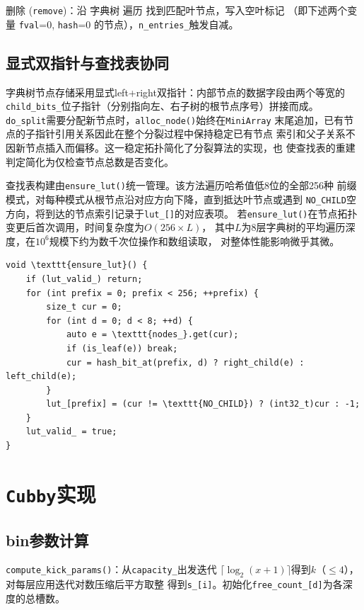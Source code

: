 \documentclass[
    type = bachelor,
    fontset = win,
    decl-page = true,
  ]{njuthesis}
\begin{document}
删除 (\texttt{remove})：沿 字典树 遍历 找到匹配叶节点，写入空叶标记
（即下述两个变量 \texttt{fval}=0, \texttt{hash}=0 的节点），\texttt{n\_entries\_}触发自减。

\subsection{显式双指针与查找表协同}

字典树节点存储采用显式left+right双指针：内部节点的数据字段由两个等宽的
\texttt{child\_bits\_}位子指针（分别指向左、右子树的根节点序号）拼接而成。
\texttt{do\_split}需要分配新节点时，\texttt{alloc\_node()}始终在\texttt{MiniArray}
末尾追加，已有节点的子指针引用关系因此在整个分裂过程中保持稳定已有节点
索引和父子关系不因新节点插入而偏移。这一稳定拓扑简化了分裂算法的实现，也
使查找表的重建判定简化为仅检查节点总数是否变化。

查找表构建由\texttt{ensure\_lut()}统一管理。该方法遍历哈希值低8位的全部256种
前缀模式，对每种模式从根节点沿对应方向下降，直到抵达叶节点或遇到
\texttt{NO\_CHILD}空方向，将到达的节点索引记录于\texttt{lut\_[]}的对应表项。
若\texttt{ensure\_lut()}在节点拓扑变更后首次调用，时间复杂度为$O(256 \times L)$，
其中$L$为8层字典树的平均遍历深度，在$10^6$规模下约为数千次位操作和数组读取，
对整体性能影响微乎其微。

\begin{lstlisting}[caption={查找表 构建与查询}]
void \texttt{ensure_lut}() {
    if (lut_valid_) return;
    for (int prefix = 0; prefix < 256; ++prefix) {
        size_t cur = 0;
        for (int d = 0; d < 8; ++d) {
            auto e = \texttt{nodes_}.get(cur);
            if (is_leaf(e)) break;
            cur = hash_bit_at(prefix, d) ? right_child(e) : left_child(e);
        }
        lut_[prefix] = (cur != \texttt{NO_CHILD}) ? (int32_t)cur : -1;
    }
    lut_valid_ = true;
}
\end{lstlisting}

\section{\texttt{Cubby}实现}

\subsection{bin参数计算}

\texttt{compute\_kick\_params()}：从\texttt{capacity\_}出发迭代
$\lceil\log_2(x+1)\rceil$得到$k$（$\le 4$），对每层应用迭代对数压缩后平方取整
得到\texttt{s\_[i]}。初始化\texttt{free\_count\_[d]}为各深度的总槽数。
\end{document}
